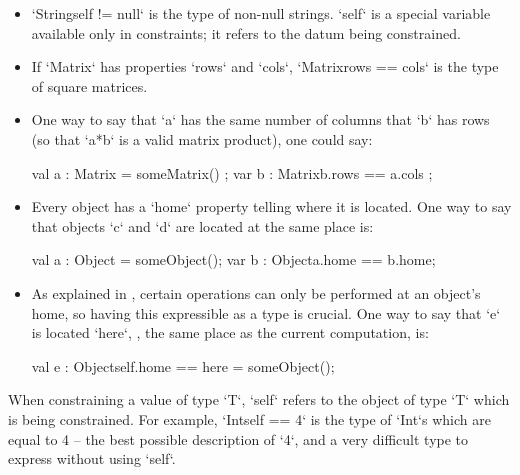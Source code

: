 {\begin{itemize}
\item \xcd`String{self != null}` is the type of non-null strings.  \xcd`self`
      is a special variable available only in constraints; it refers to the
      datum being constrained.   
\item If \xcd`Matrix` has properties \xcd`rows` and \xcd`cols`, 
      \xcd`Matrix{rows == cols}` is the type of square matrices.
\item One way to say that \xcd`a` has the same number of columns that \xcd`b`
      has rows (so that \xcd`a*b` is a valid matrix product), one could say: 
\begin{xten}
  val a : Matrix = someMatrix() ;
  var b : Matrix{b.rows == a.cols} ;
\end{xten}

\item Every object has a \xcd`home` property telling where it is located.
      One way to say that objects \xcd`c` and \xcd`d` are located at the same
      place is: 
\begin{xten}
  val a : Object = someObject();
  var b : Object{a.home == b.home};
\end{xten}

\item  As explained in , certain operations
can only be performed at an object's home, so having this expressible as a
type is crucial. One way to say that \xcd`e` is located \xcd`here`, \viz, the same place
      as the current computation, is: 
\begin{xten}
  val e : Object{self.home == here} = someObject();
\end{xten}
\end{itemize}

When constraining a value of type \xcd`T`, \xcd`self` refers to the object of
type \xcd`T` which is being constrained.  For example, \xcd`Int{self == 4}` is
the type of \xcd`Int`s which are equal to 4 -- the best possible description
of \xcd`4`, and a very difficult type to express without using \xcd`self`.  






}

